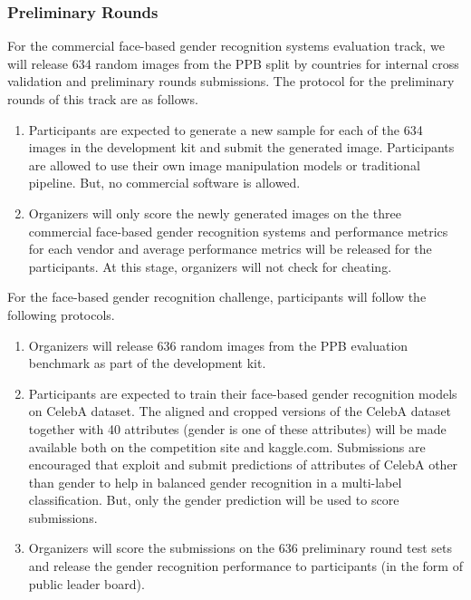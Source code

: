 \documentclass[11pt, oneside]{article}
\begin{document}
\subsubsection{Preliminary Rounds}

For the commercial face-based gender recognition systems evaluation track, we will release 634 random images from the PPB split by countries for internal cross validation and preliminary rounds submissions. The protocol for the preliminary rounds of this track are as follows.

\begin{enumerate}
    \item Participants are expected to generate a new sample for each of the 634 images in the development kit and submit the generated image. Participants are allowed to use their own image manipulation models or traditional pipeline. But, no commercial software is allowed.
    \item Organizers will only score the newly generated images on the three commercial face-based gender recognition systems and performance metrics for each vendor and average performance metrics will be released for the participants. At this stage, organizers will not check for cheating.
\end{enumerate}

For the face-based gender recognition challenge, participants will follow the following protocols.

\begin{enumerate}
    \item Organizers will release 636 random images from the PPB evaluation benchmark as part of the development kit.
    \item Participants are expected to train their face-based gender recognition models on CelebA dataset. The aligned and cropped versions of the CelebA dataset together with 40 attributes (gender is one of these attributes) will be made available both on the competition site and kaggle.com. Submissions are encouraged that exploit and submit predictions of attributes of CelebA other than gender to help in balanced gender recognition in a multi-label classification. But, only the gender prediction will be used to score submissions.
    \item Organizers will score the submissions on the 636 preliminary round test sets and release the gender recognition performance to participants (in the form of public leader board).
\end{enumerate}
\end{document}

